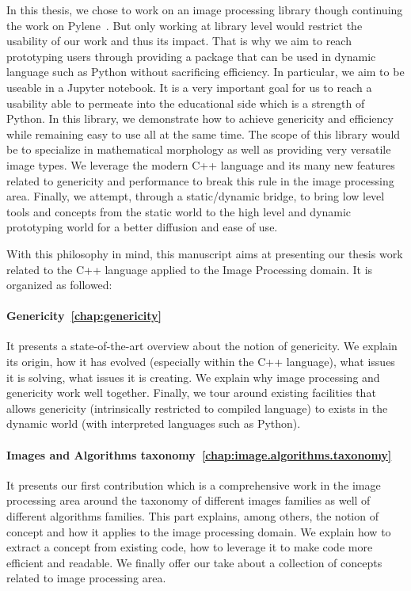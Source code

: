 In this thesis, we chose to work on an image processing library though continuing the work on
Pylene~\parencite{carlinet.2018.pylena}. But only working at library level would restrict the usability of our work and
thus its impact. That is why we aim to reach prototyping users through providing a package that can be used in dynamic
language such as Python without sacrificing efficiency. In particular, we aim to be useable in a Jupyter notebook. It is
a very important goal for us to reach a usability able to permeate into the educational side which is a strength of
Python. In this library, we demonstrate how to achieve genericity and efficiency while remaining easy to use all at the
same time. The scope of this library would be to specialize in mathematical morphology as well as providing very
versatile image types. We leverage the modern C++ language and its many new features related to genericity and
performance to break this rule in the image processing area. Finally, we attempt, through a static/dynamic bridge, to
bring low level tools and concepts from the static world to the high level and dynamic prototyping world for a better
diffusion and ease of use.

With this philosophy in mind, this manuscript aims at presenting our thesis work related to the C++ language applied to
the Image Processing domain. It is organized as followed:

\paragraph{Genericity~\ref{chap:genericity}} It presents a state-of-the-art overview about the notion of genericity. We
explain its origin, how it has evolved (especially within the C++ language), what issues it is solving, what issues it
is creating. We explain why image processing and genericity work well together. Finally, we tour around existing
facilities that allows genericity (intrinsically restricted to compiled language) to exists in the dynamic world (with
interpreted languages such as Python).

\paragraph{Images and Algorithms taxonomy~\ref{chap:image.algorithms.taxonomy}} It presents our first contribution which
is a comprehensive work in the image processing area around the taxonomy of different images families as well of
different algorithms families. This part explains, among others, the notion of concept and how it applies to the image
processing domain. We explain how to extract a concept from existing code, how to leverage it to make code more
efficient and readable. We finally offer our take about a collection of concepts related to image processing area.

